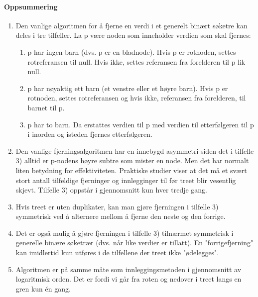 \documentclass[11pt]{article}
\begin{document}
        \paragraph{Oppsummering}
            \begin{enumerate}
                \item  Den vanlige algoritmen for å fjerne en verdi i et generelt binært søketre kan deles i tre
                    tilfeller. La p være noden som inneholder verdien som skal fjernes:
                    \begin{enumerate}
                        \item p har ingen barn (dvs. p er en bladnode). Hvis p er rotnoden, settes rotreferansen
                                til null. Hvis ikke, settes referansen fra forelderen til p lik null.
                        \item p har nøyaktig ett barn (et venstre eller et høyre barn). Hvis p er rotnoden, settes
                                rotreferansen og hvis ikke, referansen fra forelderen, til barnet til p.
                        \item p har to barn. Da erstattes verdien til p med verdien til etterfølgeren til p i inorden
                                og isteden fjernes etterfølgeren.
                    \end{enumerate}
                \item Den vanlige fjerningsalgoritmen har en innebygd asymmetri siden det i tilfelle 3) alltid
                    er p-nodens høyre subtre som mister en node. Men det har normalt liten betydning for
                    effektiviteten. Praktiske studier viser at det må et svært stort antall tilfeldige fjerninger
                    og innlegginger til før treet blir vesentlig skjevt. Tilfelle 3) oppstår i gjennomsnitt kun
                    hver tredje gang.
                \item Hvis treet er uten duplikater, kan man gjøre fjerningen i tilfelle 3) symmetrisk ved å
                    alternere mellom å fjerne den neste og den forrige.
                \item Det er også mulig å gjøre fjerningen i tilfelle 3) tilnærmet symmetrisk i generelle
                    binære søketrær (dvs. når like verdier er tillatt). En "forrigefjerning" kan imidlertid kun
                    utføres i de tilfellene der treet ikke "ødelegges".
                \item Algoritmen er på samme måte som innleggingsmetoden i gjennomsnitt av logaritmisk
                    orden. Det er fordi vi går fra roten og nedover i treet langs en gren kun én gang.
            \end{enumerate}
\end{document}
